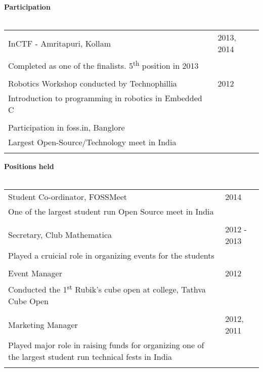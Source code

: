 \documentclass[a4paper,10pt]{article} %
\begin{document}
\textbf{Participation}\\ \\
\begin{tabular}{p{11cm}p{11cm}}
        \textsf{InCTF - Amritapuri, Kollam}                                                & \textsf{2013, 2014} \\
        \textsf{Completed as one of the finalists. 5\textsuperscript{th} position in 2013} & \\ \\
        \textsf{Robotics Workshop conducted by Technophillia}                              & \textsf{2012} \\
        \textsf{Introduction to programming in robotics in Embedded C}                     & \\ \\
        \textsf{Participation in foss.in, Banglore}                                        & \\
        \textsf{Largest Open-Source/Technology meet in India}                              & \\ \\
\end{tabular}

\textbf{Positions held}\\ \\
\begin{tabular}{p{11cm}p{11cm}}
        \textsf{Student Co-ordinator, FOSSMeet}                                                                            & \textsf{2014} \\
        \textsf{One of the largest student run Open Source meet in India}                                                  & \\ \\
        \textsf{Secretary, Club Mathematica}                                                                               & \textsf{2012 - 2013} \\
        \textsf{Played a cruicial role in organizing events for the students}                                              & \\ \\
        \textsf{Event Manager}                                                                                             & \textsf{2012} \\
        \textsf{Conducted the 1\textsuperscript{st} Rubik's cube open at college, Tathva Cube Open}                        & \\ \\
        \textsf{Marketing Manager}                                                                                         & \textsf{2012, 2011} \\
        \textsf{Played major role in raising funds for organizing one of the largest student run technical fests in India} & \\ \\
\end{tabular}
\end{document}
